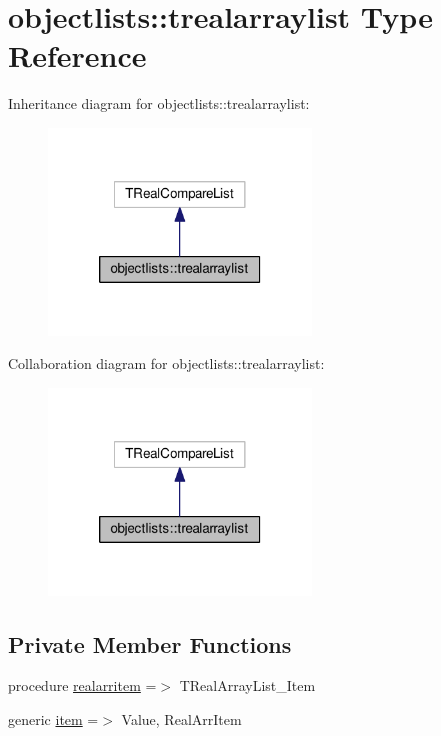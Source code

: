 \hypertarget{structobjectlists_1_1trealarraylist}{}\section{objectlists\+:\+:trealarraylist Type Reference}
\label{structobjectlists_1_1trealarraylist}


Inheritance diagram for objectlists\+:\+:trealarraylist\+:
\nopagebreak
\begin{figure}[H]
\begin{center}
\leavevmode
\includegraphics[width=198pt]{structobjectlists_1_1trealarraylist__inherit__graph}
\end{center}
\end{figure}


Collaboration diagram for objectlists\+:\+:trealarraylist\+:
\nopagebreak
\begin{figure}[H]
\begin{center}
\leavevmode
\includegraphics[width=198pt]{structobjectlists_1_1trealarraylist__coll__graph}
\end{center}
\end{figure}
\subsection*{Private Member Functions}
\begin{DoxyCompactItemize}
\item 
procedure \mbox{\hyperlink{structobjectlists_1_1trealarraylist_abe6fbf3ac5da2daa8d5a9478cc6967ad}{realarritem}} =$>$ T\+Real\+Array\+List\+\_\+\+Item
\item 
generic \mbox{\hyperlink{structobjectlists_1_1trealarraylist_a6643ba94ad4b7c66ac51846763715bef}{item}} =$>$ Value, Real\+Arr\+Item
\end{DoxyCompactItemize}


